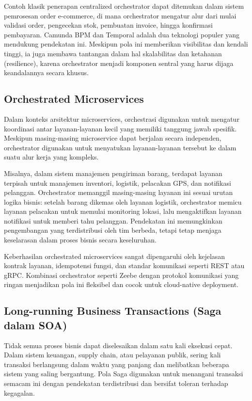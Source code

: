 Contoh klasik penerapan centralized orchestrator dapat ditemukan dalam sistem pemrosesan order e-commerce, di mana orchestrator mengatur alur dari mulai validasi order, pengecekan stok, pembuatan invoice, hingga konfirmasi pembayaran. Camunda BPM dan Temporal adalah dua teknologi populer yang mendukung pendekatan ini. Meskipun pola ini memberikan visibilitas dan kendali tinggi, ia juga membawa tantangan dalam hal skalabilitas dan ketahanan (resilience), karena orchestrator menjadi komponen sentral yang harus dijaga keandalannya secara khusus.

\subsection{Orchestrated Microservices}

Dalam konteks arsitektur microservices, orchestrasi digunakan untuk mengatur koordinasi antar layanan-layanan kecil yang memiliki tanggung jawab spesifik. Meskipun masing-masing microservice dapat berjalan secara independen, orchestrator digunakan untuk menyatukan layanan-layanan tersebut ke dalam suatu alur kerja yang kompleks.

Misalnya, dalam sistem manajemen pengiriman barang, terdapat layanan terpisah untuk manajemen inventori, logistik, pelacakan GPS, dan notifikasi pelanggan. Orchestrator memanggil masing-masing layanan ini sesuai urutan logika bisnis: setelah barang dikemas oleh layanan logistik, orchestrator memicu layanan pelacakan untuk memulai monitoring lokasi, lalu mengaktifkan layanan notifikasi untuk memberi tahu pelanggan. Pendekatan ini memungkinkan pengembangan yang terdistribusi oleh tim berbeda, tetapi tetap menjaga keselarasan dalam proses bisnis secara keseluruhan.

Keberhasilan orchestrated microservices sangat dipengaruhi oleh kejelasan kontrak layanan, idempotensi fungsi, dan standar komunikasi seperti REST atau gRPC. Kombinasi orchestrator seperti Zeebe dengan protokol komunikasi yang ringan menjadikan pola ini fleksibel dan cocok untuk cloud-native deployment.

\subsection{Long-running Business Transactions (Saga dalam SOA)}

Tidak semua proses bisnis dapat diselesaikan dalam satu kali eksekusi cepat. Dalam sistem keuangan, supply chain, atau pelayanan publik, sering kali transaksi berlangsung dalam waktu yang panjang dan melibatkan beberapa sistem yang saling bergantung. Pola Saga digunakan untuk menangani transaksi semacam ini dengan pendekatan terdistribusi dan bersifat toleran terhadap kegagalan.

